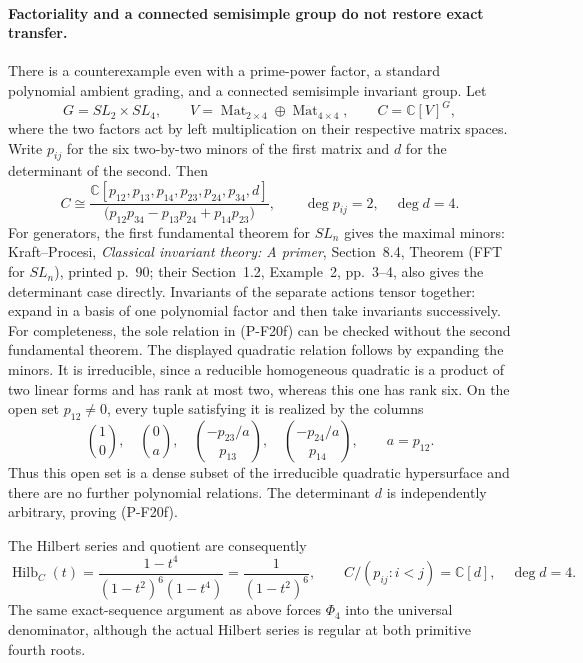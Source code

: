 \documentclass[11pt,a4paper]{article}
\begin{document}
\paragraph{Factoriality and a connected semisimple group do not restore exact transfer.}
There is a counterexample even with a prime-power factor, a standard
polynomial ambient grading, and a connected semisimple invariant group.
Let
\[
 G=SL_2\times SL_4,\qquad
 V=\operatorname{Mat}_{2\times4}\oplus
       \operatorname{Mat}_{4\times4},\qquad
 C=\mathbb C[V]^G,
\]
where the two factors act by left multiplication on their respective
matrix spaces. Write $p_{ij}$ for the six two-by-two minors of the
first matrix and $d$ for the determinant of the second. Then
\[
 C\cong
 \frac{\mathbb C[p_{12},p_{13},p_{14},p_{23},p_{24},p_{34},d]}
 {\bigl(p_{12}p_{34}-p_{13}p_{24}+p_{14}p_{23}\bigr)},
 \qquad \deg p_{ij}=2,\quad\deg d=4.
 \tag{P-F20f}
\]
For generators, the first fundamental theorem for $SL_n$ gives the
maximal minors: Kraft--Procesi, \emph{Classical invariant theory:
A primer}, Section~8.4, Theorem (FFT for $SL_n$), printed p.~90;
their Section~1.2, Example~2, pp.~3--4, also gives the determinant
case directly. Invariants of the separate actions tensor together:
expand in a basis of one polynomial factor and then take invariants
successively. For completeness, the sole relation in (P-F20f) can
be checked without the second fundamental theorem. The displayed
quadratic relation follows by expanding the minors. It is irreducible,
since a reducible homogeneous quadratic is a product of two linear
forms and has rank at most two, whereas this one has rank six. On
the open set $p_{12}\ne0$, every tuple satisfying it is realized
by the columns
\[
 \binom10,\quad \binom0a,\quad
 \binom{-p_{23}/a}{p_{13}},\quad
 \binom{-p_{24}/a}{p_{14}},\qquad a=p_{12}.
\]
Thus this open set is a dense subset of the irreducible quadratic
hypersurface and there are no further polynomial relations. The
determinant $d$ is independently arbitrary, proving (P-F20f).

The Hilbert series and quotient are consequently
\[
 \operatorname{Hilb}_C(t)
   =\frac{1-t^4}{(1-t^2)^6(1-t^4)}
   =\frac1{(1-t^2)^6},\qquad
 C/(p_{ij}:i<j)=\mathbb C[d],\quad\deg d=4.
 \tag{P-F20g}
\]
The same exact-sequence argument as above forces $\Phi_4$ into
the universal denominator, although the actual Hilbert series is
regular at both primitive fourth roots.
\end{document}
